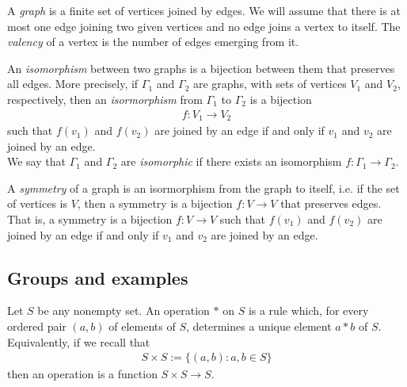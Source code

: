 \documentclass{article}
\begin{document}
\begin{definition}
    A \emph{graph} is a finite set of vertices joined by edges. We will
    assume that there is at most one edge joining two given vertices and
    no edge joins a vertex to itself. The \emph{valency} of a vertex
    is the number of edges emerging from it.
\end{definition}

\setcounter{theorem}{2}
\begin{definition}
    An \emph{isomorphism} between two graphs is a bijection between them
    that preserves all edges. More precisely, if $\Gamma_1$ and $\Gamma_2$
    are graphs, with sets of vertices $V_1$ and $V_2$, respectively, then
    an \emph{isormorphism} from $\Gamma_1$ to $\Gamma_2$ is a bijection
    \begin{align*}
        f:V_1\to V_2
    \end{align*}
    such that $f(v_1)$ and $f(v_2)$ are joined by an edge if and only if
    $v_1$ and $v_2$ are joined by an edge.\\
    We say that $\Gamma_1$ and $\Gamma_2$ are \emph{isomorphic} if there
    exists an isomorphism $f:\Gamma_1\to \Gamma_2$.
\end{definition}

\setcounter{theorem}{8}
\begin{definition}
    A \emph{symmetry} of a graph is an isormorphism from the graph to
    itself, i.e. if the set of vertices is $V$, then a symmetry is a
    bijection $f:V\to V$ that preserves edges. That is, a symmetry is
    a bijection $f:V\to V$ such that $f(v_1)$ and $f(v_2)$ are joined
    by an edge if and only if $v_1$ and $v_2$ are joined by an edge.
\end{definition}

\subsection{Groups and examples}

\begin{definition}
    Let $S$ be any nonempty set. An operation $*$ on $S$ is a rule
    which, for every ordered pair $(a,b)$ of elements of $S$, determines
    a unique element $a* b$ of $S$. Equivalently, if we recall that
    \begin{align*}
        S\times S := \{(a,b) : a,b\in S\}
    \end{align*}
    then an operation is a function $S\times S\to S$.
\end{definition}
\end{document}
